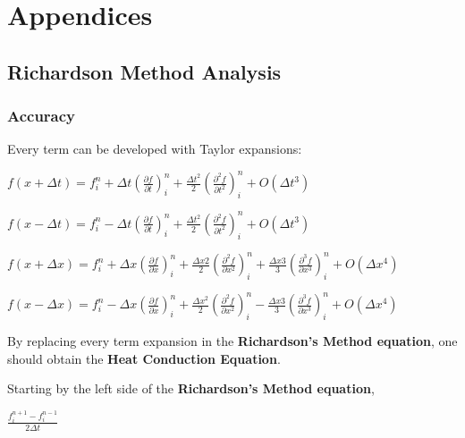\documentclass[12pt]{article}
\begin{document}
\section*{Appendices}

\subsection*{Richardson Method Analysis}

\subsubsection*{Accuracy}

Every term can be developed with Taylor expansions:


\begin{center}
\Large
$
f(x + \Delta t) = f_i^{n} + \Delta t \left( \frac{\partial f}{\partial t} \right)_i^n + \frac{\Delta t ^2}{2} \left( \frac{\partial ^2 f}{\partial t ^2} \right)_i^n + O(\Delta t ^3)
$
\end{center}
\begin{center}
\Large
$
f(x - \Delta t)  = f_i^{n} - \Delta t \left( \frac{\partial f}{\partial t} \right)_i^n + \frac{\Delta t ^2}{2} \left( \frac{\partial ^2 f}{\partial t ^2} \right)_i^n + O(\Delta t ^3)
$
\end{center}
\begin{center}
\Large
$
f(x + \Delta x)  = f_i^{n} + \Delta x \left( \frac{\partial f}{\partial x} \right)_i^n + \frac{\Delta x 2}{2} \left( \frac{\partial ^2 f}{\partial x ^2} \right)_i^n + \frac{\Delta x 3}{3} \left( \frac{\partial ^3 f}{\partial x ^3} \right)_i^n + O(\Delta x ^4)
$
\end{center}
\begin{center}
\Large
$
f(x - \Delta x) = f_i^{n} - \Delta x \left( \frac{\partial f}{\partial x} \right)_i^n + \frac{\Delta x ^2}{2} \left( \frac{\partial ^2 f}{\partial x ^2} \right)_i^n - \frac{\Delta x 3}{3} \left( \frac{\partial ^3 f}{\partial x ^3} \right)_i^n + O(\Delta x ^4)
$
\end{center}

\par By replacing every term expansion in the \textbf{Richardson's Method equation}, one should obtain the \textbf{Heat Conduction Equation}.

\par Starting by the left side of the \textbf{Richardson's Method equation},
\begin{center}
\Large
$
\frac{f_i^{n + 1} - f_i^{n - 1}}{2 \Delta t}
$
\end{center}
\end{document}
